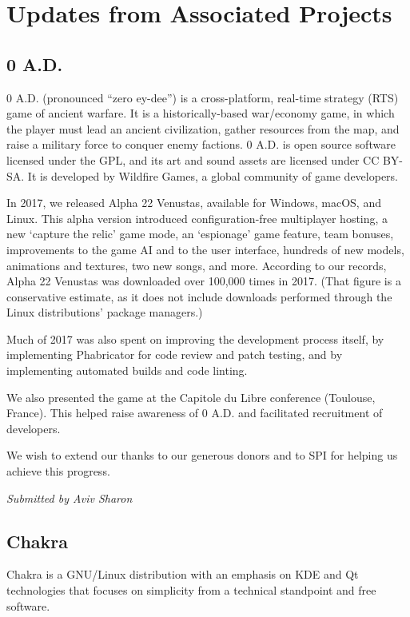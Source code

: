 \documentclass[a4paper]{report}
\begin{document}
\section{Updates from Associated Projects}

\subsection{0 A.D.}

0 A.D. (pronounced ``zero ey-dee'') is a cross-platform, real-time
strategy (RTS) game of ancient warfare. It is a historically-based
war/economy game, in which the player must lead an ancient civilization,
gather resources from the map, and raise a military force to conquer
enemy factions. 0 A.D. is open source software licensed under the GPL,
and its art and sound assets are licensed under CC BY-SA. It is
developed by Wildfire Games, a global community of game developers.

In 2017, we released Alpha 22 Venustas, available for Windows, macOS,
and Linux. This alpha version introduced configuration-free multiplayer
hosting, a new `capture the relic' game mode, an `espionage' game
feature, team bonuses, improvements to the game AI and to the user
interface, hundreds of new models, animations and textures, two new
songs, and more.  According to our records, Alpha 22 Venustas was
downloaded over 100,000 times in 2017. (That figure is a conservative
estimate, as it does not include downloads performed through the Linux
distributions' package managers.)

Much of 2017 was also spent on improving the development process itself,
by implementing Phabricator for code review and patch testing, and by
implementing automated builds and code linting.

We also presented the game at the Capitole du Libre conference
(Toulouse, France). This helped raise awareness of 0 A.D. and
facilitated recruitment of developers.

We wish to extend our thanks to our generous donors and to SPI for
helping us achieve this progress.

{\em Submitted by Aviv Sharon}

\subsection{Chakra}

Chakra is a GNU/Linux distribution with an emphasis on KDE and Qt
technologies that focuses on simplicity from a technical standpoint and
free software.
\end{document}
